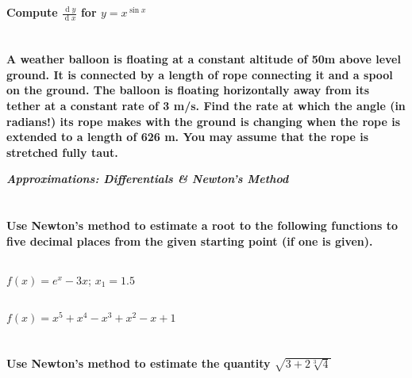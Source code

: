 \documentclass[english]{article}
\renewcommand{\d}[1]{\ensuremath{\operatorname{d}\!{#1}}}
\newcommand{\dydx}[2]{\frac{\d #1}{\d #2}}
\newcommand{\prob}[1]{\setcounter{section}{#1-1}\section{}}
\newcommand{\prt}[1]{\setcounter{subsection}{#1-1}\subsection{}}
\theoremstyle{remark}
\theoremstyle{definition}
\begin{document}
	\prob{3}
\textbf{Compute $\dydx{y}{x}$ for $y=x^{\sin{x}}$}\vspace{3.5in}
\prob{4} \textbf{A weather balloon is floating at a constant altitude of 50m above level ground. It is connected by a length of rope connecting it and a spool on the ground. The balloon is floating horizontally away from its tether at a constant rate of 3 m/s. Find the rate at which the angle (in radians!) its rope makes with the ground is changing when the rope is extended to a length of 626 m. You may assume that the rope is stretched fully taut.}
\newpage
		\begin{center}{\Large\textbf{\emph{Approximations: Differentials \& Newton's Method}}}\end{center}
		\prob{5} \textbf{Use Newton's method to estimate a root to the following functions to five decimal places from the given starting point (if one is given).}
		\prt{1} $f(x)=e^x-3x$; $x_1=1.5$\vspace{4in}
		\prt{2} $f(x)=x^5+x^4-x^3+x^2-x+1$\newpage
		\prob{6} \textbf{Use Newton's method to estimate the quantity $\sqrt{3+2\sqrt[3]{4}}$}\vspace{3in}
\end{document}
